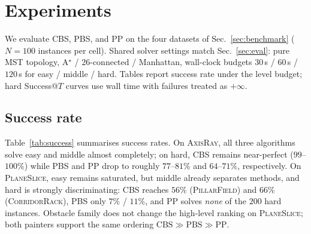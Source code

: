 
\section{Experiments}
\label{sec:experiments}

We evaluate CBS, PBS, and PP on the four datasets of Sec.~\ref{sec:benchmark}
($N{=}100$ instances per cell). Shared solver settings match
Sec.~\ref{sec:eval}: pure MST topology, A$^\star$ / 26-connected / Manhattan,
wall-clock budgets $30$\,s / $60$\,s / $120$\,s for easy / middle / hard.
Tables report success rate under the level budget; hard Success@$T$ curves use
wall time with failures treated as $+\infty$.

\subsection{Success rate}
\label{sec:success}

Table~\ref{tab:success} summarises success rates.
On \textsc{AxisRay}, all three algorithms solve easy and middle almost
completely; on hard, CBS remains near-perfect ($99$--$100\%$) while PBS and PP
drop to roughly $77$--$81\%$ and $64$--$71\%$, respectively.
On \textsc{PlaneSlice}, easy remains saturated, but middle already separates
methods, and hard is strongly discriminating:
CBS reaches $56\%$ (\textsc{PillarField}) and $66\%$ (\textsc{CorridorRack}),
PBS only $7\%$ / $11\%$, and PP solves \emph{none} of the $200$ hard instances.
Obstacle family does not change the high-level ranking on
\textsc{PlaneSlice}; both painters support the same ordering
$\mathrm{CBS}\gg\mathrm{PBS}\gg\mathrm{PP}$.


